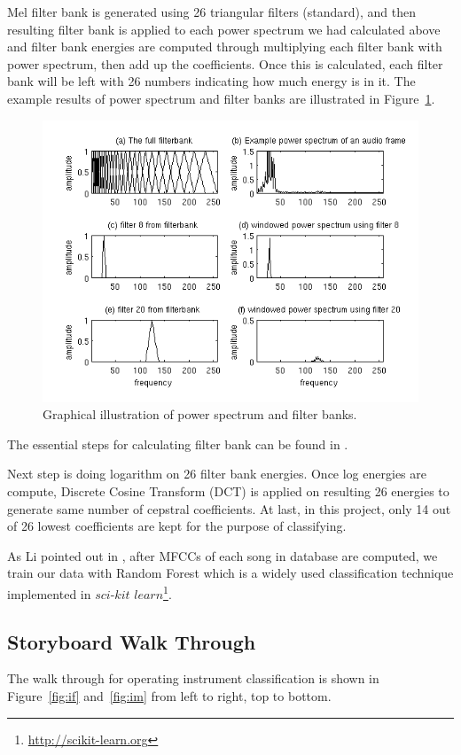 \documentclass[whitelogo,12pt]{tudelft-report}
\begin{document}
Mel filter bank is generated using 26 triangular filters (standard), and then resulting filter bank is applied to each power spectrum we had calculated above and filter bank energies are computed through multiplying each filter bank with power spectrum, then add up the coefficients. Once this is calculated, each filter bank will be left with 26 numbers indicating how much energy is in it. The example results of power spectrum and filter banks are illustrated in Figure~\ref{fig:filter}.
\begin{figure}
\centering
\includegraphics[scale=0.7]{mel_filterbank_example}
\caption{Graphical illustration of power spectrum and filter banks.}
\label{fig:filter}
\end{figure}
The essential steps for calculating filter bank can be found in \cite{milner2002}.

Next step is doing logarithm on 26 filter bank energies. Once log energies are compute, Discrete Cosine Transform (DCT) is applied on resulting 26 energies to generate same number of cepstral coefficients. At last, in this project, only 14 out of 26 lowest coefficients are kept for the purpose of classifying.

As Li pointed out in \cite{li2015}, after MFCCs of each song in database are computed, we train our data with Random Forest which is a widely used classification technique implemented in $sci$-$kit$ $learn$\footnote{\url{http://scikit-learn.org}}. 

\subsection{Storyboard Walk Through}
The walk through for operating instrument classification is shown in Figure~\ref{fig:if} and~\ref{fig:im} from left to right, top to bottom.
\end{document}

